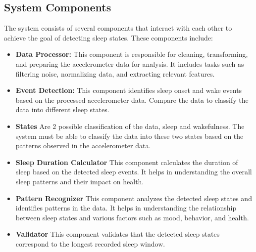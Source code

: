 \documentclass[conference]{IEEEtran}
\begin{document}
\subsection{System Components}
The system consists of several components that interact with each other to achieve the goal of detecting sleep states. These components include:
\begin{itemize}
    \item \textbf{Data Processor:} This component is responsible for cleaning, transforming, and preparing the accelerometer data for analysis. It includes tasks such as filtering noise, normalizing data, and extracting relevant features.
    \item \textbf{Event Detection:} This component identifies sleep onset and wake events based on the processed accelerometer data. Compare the data to classify the data into different sleep states.
    \item \textbf{States} Are 2 possible classification of the data, sleep and wakefulness. The system must be able to classify the data into these two states based on the patterns observed in the accelerometer data.
    \item \textbf{Sleep Duration Calculator} This component calculates the duration of sleep based on the detected sleep events. It helps in understanding the overall sleep patterns and their impact on health.
    \item \textbf{Pattern Recognizer} This component analyzes the detected sleep states and identifies patterns in the data. It helps in understanding the relationship between sleep states and various factors such as mood, behavior, and health.
    \item \textbf{Validator} This component validates that the detected sleep states correspond to the longest recorded sleep window.
\end{itemize}
\end{document}
